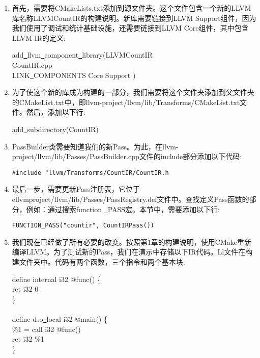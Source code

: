 \begin{enumerate}
\item 首先，需要将CMakeLists.txt添加到源文件夹。这个文件包含一个新的LLVM库名称LLVM\allowbreak CountIR的构建说明。新库需要链接到LLVM Support组件，因为我们使用了调试和统计基础设施，还需要链接到LLVM Core组件，其中包含LLVM IR的定义:
\begin{tcolorbox}[colback=white,colframe=black]
add\underline{~}llvm\underline{~}component\underline{~}library(LLVMCountIR \\
\hspace*{0.5cm}CountIR.cpp \\
\hspace*{0.5cm}LINK\underline{~}COMPONENTS Core Support )
\end{tcolorbox}
	
\item 为了使这个新的库成为构建的一部分，我们需要将这个文件夹添加到父文件夹的CMakeList.txt中，即llvm-project/llvm/lib/Transforms/CMakeList.txt文件。然后，添加以下行:
\begin{tcolorbox}[colback=white,colframe=black]
add\underline{~}subdirectory(CountIR)
\end{tcolorbox}
	
\item PassBuilder类需要知道我们的新Pass。为此，在llvm-project/llvm/lib/Passes/PassBuilder.cpp文件的include部分添加以下代码:
\begin{lstlisting}[caption={}]
#include "llvm/Transforms/CountIR/CountIR.h
\end{lstlisting}
	
\item 最后一步，需要更新Pass注册表，它位于ellvmproject/llvm/lib/Passes/PassRegistry.def文件中。查找定义Pass函数的部分，例如：通过搜索function \underline{~}PASS宏。本节中，需要添加以下行:
\begin{lstlisting}[caption={}]
FUNCTION_PASS("countir", CountIRPass())
\end{lstlisting}
	
\item 我们现在已经做了所有必要的改变。按照第1章的构建说明，使用CMake重新编译LLVM。为了测试新的Pass，我们在演示中存储以下IR代码。Ll文件在构建文件夹中。代码有两个函数，三个指令和两个基本块:
\begin{tcolorbox}[colback=white,colframe=black]
define internal i32 @func() \{ \\
\hspace*{0.5cm}ret i32 0 \\
\} \\
\\
define dso\underline{~}local i32 @main() \{ \\
\hspace*{0.5cm}	\%1 = call i32 @func() \\
\hspace*{0.5cm}	ret i32 \%1 \\
\}
\end{tcolorbox}
	

\end{enumerate}
